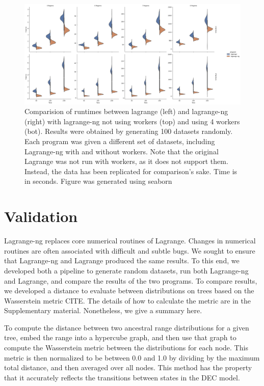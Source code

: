 \documentclass[oupdraft]{sysbio}
\begin{document}
\begin{figure}
  \noindent
  \includegraphics[width=\linewidth]{all_results_violin.png}
  \caption{Comparision of runtimes between lagrange (left) and lagrange-ng (right) with lagrange-ng not using workers
    (top) and using 4 workers (bot). Results were obtained by generating 100 datasets randomly. Each program was given a
    different set of datasets, including Lagrange-ng with and without workers. Note that the original Lagrange was not
    run with workers, as it does not support them. Instead, the data has been replicated for comparison's sake. Time is
    in seconds. Figure was generated using seaborn \citep{Waskom2021}}
\end{figure}

\bigskip

\section{Validation}\label{sec:Validation}

Lagrange-ng replaces core numerical routines of Lagrange. Changes in numerical routines are often associated with
difficult and subtle bugs. We sought to ensure that Lagrange-ng and Lagrange produced the same results. To this end, we
developed both a pipeline to generate random datasets, run both Lagrange-ng and Lagrange, and compare the results of the
two programs. To compare results, we developed a distance to evaluate between distributions on trees based on the
Wasserstein metric CITE. The details of how to calculate the metric are in the Supplementary material. Nonetheless, we
give a summary here.

To compute the distance between two ancestral range distributions for a given tree, embed the range into a hypercube
graph, and then use that graph to compute the Wasserstein metric between the distributions for each node. This metric is
then normalized to be between 0.0 and 1.0 by dividing by the maximum total distance, and then averaged over all nodes.
This method has the property that it accurately reflects the transitions between states in the DEC model. 
\end{document}
